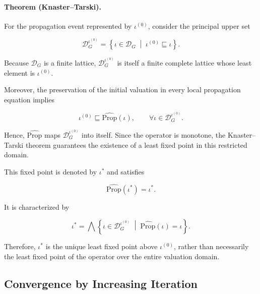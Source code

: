 \documentclass[10pt]{article}
\begin{document}
\paragraph{Theorem (Knaster--Tarski).}
For the propagation event represented by $\iota^{(0)}$, consider the principal upper set

\begin{equation}
	\mathcal D_G^{\iota^{(0)}}
	=
	\left\{
	\iota\in\mathcal D_G
	\;\middle|\;
	\iota^{(0)}
	\sqsubseteq
	\iota
	\right\}.
	\label{eq:initial_upper_domain}
\end{equation}

Because $\mathcal D_G$ is a finite lattice,
$\mathcal D_G^{\iota^{(0)}}$ is itself a finite complete lattice whose least element is $\iota^{(0)}$.

Moreover, the preservation of the initial valuation in every local propagation equation implies

\begin{equation}
	\iota^{(0)}
	\sqsubseteq
	\widehat{\mathrm{Prop}}(\iota),
	\qquad
	\forall
	\iota
	\in
	\mathcal D_G^{\iota^{(0)}}.
	\label{eq:operator_preserves_initial_domain}
\end{equation}

Hence,
$\widehat{\mathrm{Prop}}$ maps
$\mathcal D_G^{\iota^{(0)}}$ into itself. Since the operator is monotone, the Knaster--Tarski theorem guarantees the existence of a least fixed point in this restricted domain.

This fixed point is denoted by $\iota^{*}$ and satisfies

\begin{equation}
	\widehat{\mathrm{Prop}}
	\left(
	\iota^{*}
	\right)
	=
	\iota^{*}.
	\label{eq:least_fixed_point_above_initial}
\end{equation}

It is characterized by

\begin{equation}
	\iota^{*}
	=
	\bigwedge
	\left\{
	\iota
	\in
	\mathcal D_G^{\iota^{(0)}}
	\;\middle|\;
	\widehat{\mathrm{Prop}}(\iota)
	=
	\iota
	\right\}.
	\label{eq:least_fixed_point_characterization}
\end{equation}

Therefore, $\iota^{*}$ is the unique least fixed point above $\iota^{(0)}$, rather than necessarily the least fixed point of the operator over the entire valuation domain.

\subsection{Convergence by Increasing Iteration}
\end{document}
